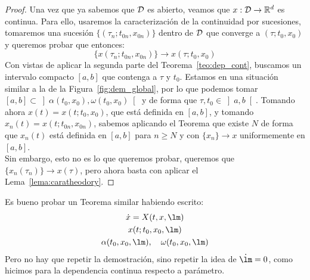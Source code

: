 \begin{proof}
    \noindent
    Una vez que ya sabemos que $\mathcal{D}$ es abierto, veamos que $x:\mathcal{D}\to \mathbb{R}^d$ es continua. Para ello, usaremos la caracterización de la continuidad por sucesiones, tomaremos una sucesión $\{(\tau_n;t_{0n},x_{0n})\}$ dentro de $\mathcal{D}$ que converge a $(\tau;t_0,x_0)$ y queremos probar que entonces:
    \begin{equation*}
        \{x(\tau_n;t_{0n},x_{0n})\} \to x(\tau;t_0,x_0)
    \end{equation*}
    Con vistas de aplicar la segunda parte del Teorema~\ref{teo:dep_cont}, buscamos un intervalo compacto $[a,b]$ que contenga a $\tau$ y $t_0$. Estamos en una situación similar a la de la Figura~\ref{fig:dem_global}, por lo que podemos tomar $[a,b]\subset \left]\alpha(t_0,x_0),\omega(t_0,x_0)\right[$ y de forma que $\tau,t_0\in \left]a,b\right[$. Tomando ahora $x(t) = x(t;t_0,x_0)$, que está definida en $[a,b]$, y tomando $x_n(t) = x(t;t_{0n},x_{0n})$, sabemos aplicando el Teorema que existe $N$ de forma que $x_n(t)$ está definida en $[a,b]$ para $n\geq N$ y con $\{x_n\}\to x$ uniformemente en $[a,b]$.\\

    \noindent
    Sin embargo, esto no es lo que queremos probar, queremos que $\{x_n(\tau_n)\}\to x(\tau)$, pero ahora basta con aplicar el Lema~\ref{lema:caratheodory}.
\end{proof}

\begin{ejercicio}
    Es bueno probar un Teorema similar habiendo escrito:
    \begin{gather*}
        \dot{x} = X(t,x,\lm) \\
        x(t;t_0,x_0,\lm) \\
        \alpha(t_0,x_0,\lm), \quad \omega(t_0,x_0,\lm)
    \end{gather*}
    Pero no hay que repetir la demostración, sino repetir la idea de $\dot{\lm} = 0$, como hicimos para la dependencia continua respecto a parámetro.
\end{ejercicio}

